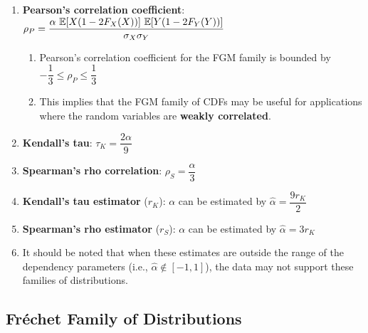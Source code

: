 \begin{enumerate}
    \item \textbf{Pearson’s correlation coefficient}:
    $
        \rho_P = \dfrac{\alpha\ \mbbE[X (1 - 2F_X (X))]\ \mbbE[Y (1 - 2F_Y (Y ))] }{\sigma_X \sigma_Y}
    $
    \hfill \cite{statistics/book/Statistics-for-Data-Scientists/Maurits-Kaptein}
    \begin{enumerate}
        \item Pearson’s correlation coefficient for the FGM family is bounded by $-\dfrac{1}{3} \leq \rho_P \leq \dfrac{1}{3}$
        \hfill \cite{statistics/book/Statistics-for-Data-Scientists/Maurits-Kaptein}

        \item This implies that the FGM family of CDFs may be useful for applications where the random variables are \textbf{weakly correlated}.
        \hfill \cite{statistics/book/Statistics-for-Data-Scientists/Maurits-Kaptein}
    \end{enumerate}

    \item \textbf{Kendall’s tau}: $\tau_K = \dfrac{2\alpha}{9}$
    \hfill \cite{statistics/book/Statistics-for-Data-Scientists/Maurits-Kaptein}

    \item \textbf{Spearman’s rho correlation}: $\rho_S = \dfrac{\alpha}{3}$
    \hfill \cite{statistics/book/Statistics-for-Data-Scientists/Maurits-Kaptein}

    \item \textbf{Kendall’s tau estimator} ($r_K$):
    $\alpha$ can be estimated by $\hat{\alpha} = \dfrac{9r_K}{2}$
    \hfill \cite{statistics/book/Statistics-for-Data-Scientists/Maurits-Kaptein}

    \item \textbf{Spearman’s rho estimator} ($r_S$):
    $\alpha$ can be estimated by $\hat{\alpha} = 3r_K$
    \hfill \cite{statistics/book/Statistics-for-Data-Scientists/Maurits-Kaptein}

    \item[] It should be noted that when these estimates are outside the range of the dependency parameters (i.e., $\hat{\alpha} \notin [-1, 1]$), the data may not support these families of distributions.
    \hfill \cite{statistics/book/Statistics-for-Data-Scientists/Maurits-Kaptein}
\end{enumerate}



\subsection{Fréchet Family of Distributions}

